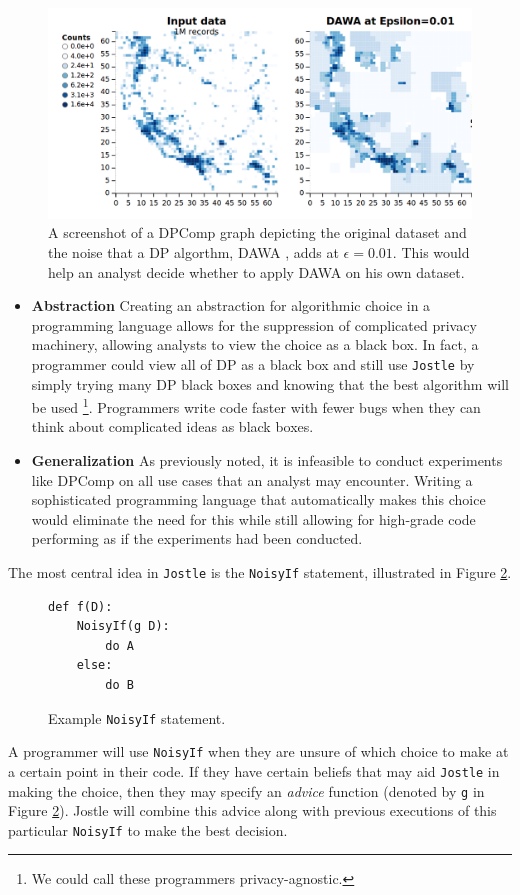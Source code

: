 \documentclass[11pt]{article}
\newcommand{\Jostle}{\texttt{Jostle}}
\begin{document}
\begin{figure}
\begin{center}
\includegraphics[scale=0.3]{DPComp}
\end{center}
\caption{A screenshot of a DPComp graph depicting the original dataset and the noise that a DP algorthm, DAWA \cite{Li:2014}, adds at $\epsilon=0.01$. This would help an analyst decide whether to apply DAWA on his own dataset.}\label{fig:dpcomp}
\end{figure}
\begin{itemize}
\item \textbf{Abstraction} Creating an abstraction for algorithmic choice in a programming language allows for the suppression of complicated privacy machinery, allowing analysts to view the choice as a black box. In fact, a programmer could view all of DP as a black box and still use \Jostle{} by simply trying many DP black boxes and knowing that the best algorithm will be used \footnote{We could call these programmers privacy-agnostic.}. Programmers write code faster with fewer bugs when they can think about complicated ideas as black boxes.
\item \textbf{Generalization} As previously noted, it is infeasible to conduct experiments like DPComp on all use cases that an analyst may encounter. Writing a sophisticated programming language that automatically makes this choice would eliminate the need for this while still allowing for high-grade code performing as if the experiments had been conducted.
\end{itemize}

The most central idea in \Jostle{} is the \texttt{NoisyIf} statement, illustrated in Figure \ref{fig:1}.
\begin{figure}
\begin{lstlisting}
def f(D):
    NoisyIf(g D):
        do A
    else:
        do B
\end{lstlisting}
\caption{Example \texttt{NoisyIf} statement.}
\label{fig:1}
\end{figure}
A programmer will use \texttt{NoisyIf} when they are unsure of which choice to make at a certain point in their code. If they have certain beliefs that may aid \Jostle{} in making the choice, then they may specify an \emph{advice} function (denoted by \texttt{g} in Figure \ref{fig:1}). Jostle will combine this advice along with previous executions of this particular \texttt{NoisyIf} to make the best decision.
\end{document}
